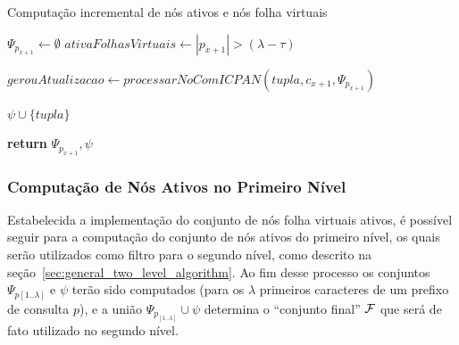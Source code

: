\begin{algorithm}[t]
\caption{Computação incremental de nós ativos e nós folha virtuais }\label{alg:compute_active_and_virtual_leaf_nodes}
\begin{algorithmic}[1]
    \State $\Psi_{p_{x+1}} \leftarrow \emptyset$
    \State $ativaFolhasVirtuais \leftarrow |p_{x+1}| > (\lambda - \tau)$
    
        \State $gerouAtualizacao \leftarrow processarNoComICPAN(tupla, c_{x+1}, \Psi_{p_{x+1}})$
        
            \State $\psi \cup \{tupla\}$
        \EndIf
    \EndFor
    
    \State \textbf{return} $\Psi_{p_{x+1}}, \psi$
\EndFunction
\end{algorithmic}
\end{algorithm}

\subsubsection{Computação de Nós Ativos no Primeiro Nível}
\label{sec:first_level_active_node_set_computation}


Estabelecida a implementação do conjunto de nós folha virtuais ativos, é possível seguir para a computação do conjunto de nós ativos do primeiro nível, os quais serão utilizados como filtro para o segundo nível, como descrito na seção~\ref{sec:general_two_level_algorithm}. Ao fim desse processo os conjuntos $\Psi_{p[1..\lambda]}$ e $\psi$ terão sido computados (para os $\lambda$ primeiros caracteres de um prefixo de consulta $p$), e a união $\Psi_{p_[1..\lambda]} \cup \psi$ determina o ``conjunto final'' $\mathcal{F}$ que será de fato utilizado no segundo nível. 

